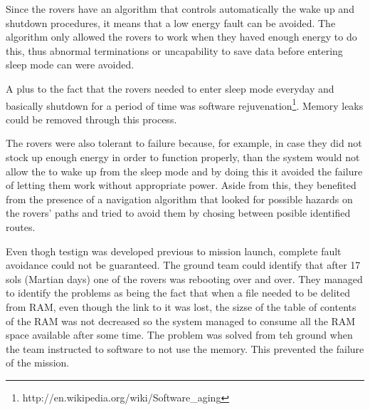 Since the rovers have an algorithm that controls automatically the wake up and
shutdown procedures, it means that a low energy fault can be avoided. The
algorithm only allowed the rovers to work when they haved enough energy to do
this, thus abnormal terminations or uncapability to save data before entering
sleep mode can were avoided. 

A plus to the fact that the rovers needed to enter sleep mode everyday and
basically shutdown for a period of time was software
rejuvenation\footnote{http://en.wikipedia.org/wiki/Software\_aging}. Memory
leaks could be removed through this process.

The rovers were also tolerant to failure because, for example, in case they did
not stock up enough energy in order to function properly, than the system would
not allow the to wake up from the sleep mode and by doing this it avoided the
failure of letting them work without appropriate power. Aside from this, they
benefited from the presence of a navigation algorithm that looked for possible
hazards on the rovers' paths and tried to avoid them by chosing between posible
identified routes.

Even thogh testign was developed previous to mission launch, complete fault
avoidance could not be guaranteed. The ground team could identify that after 17
sols (Martian days) one of the rovers was rebooting over and over. They managed
to identify the problems as being the fact that when a file needed to be delited
from RAM, even though the link to it was lost, the sizse of the table of
contents of the RAM was not decreased so the system managed to consume all the
RAM space available after some time. The problem was solved from teh ground when
the team instructed to software to not use the memory. This prevented the
failure of the mission.
